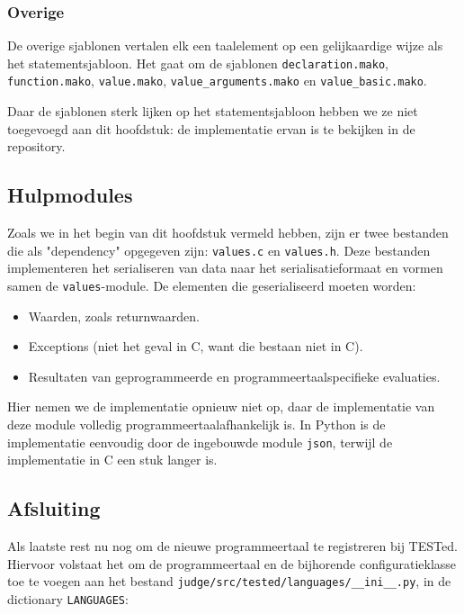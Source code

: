 \subsubsection{Overige}

De overige sjablonen vertalen elk een taalelement op een gelijkaardige wijze als het statementsjabloon.
Het gaat om de sjablonen \texttt{declaration.mako}, \texttt{function.mako}, \texttt{value.mako}, \texttt{value\_arguments.mako} en \texttt{value\_basic.mako}.

Daar de sjablonen sterk lijken op het statementsjabloon hebben we ze niet toegevoegd aan dit hoofdstuk: de implementatie ervan is te bekijken in de repository.

\subsection{Hulpmodules}\label{subsec:hulpmodules}

Zoals we in het begin van dit hoofdstuk vermeld hebben, zijn er twee bestanden die als "dependency" opgegeven zijn: \texttt{values.c} en \texttt{values.h}.
Deze bestanden implementeren het serialiseren van data naar het serialisatieformaat en vormen samen de \texttt{values}-module.
De elementen die geserialiseerd moeten worden:

\begin{itemize}
    \item Waarden, zoals returnwaarden.
    \item Exceptions (niet het geval in C, want die bestaan niet in C).
    \item Resultaten van geprogrammeerde en programmeertaalspecifieke evaluaties.
\end{itemize}

Hier nemen we de implementatie opnieuw niet op, daar de implementatie van deze module volledig programmeertaalafhankelijk is.
In Python is de implementatie eenvoudig door de ingebouwde module \texttt{json}, terwijl de implementatie in C een stuk langer is.

\subsection{Afsluiting}\label{subsec:afsluiting}

Als laatste rest nu nog om de nieuwe programmeertaal te registreren bij TESTed.
Hiervoor volstaat het om de programmeertaal en de bijhorende configuratieklasse toe te voegen aan het bestand \texttt{judge/src/tested/languages/\_\_ini\_\_.py}, in de dictionary \texttt{LANGUAGES}:

